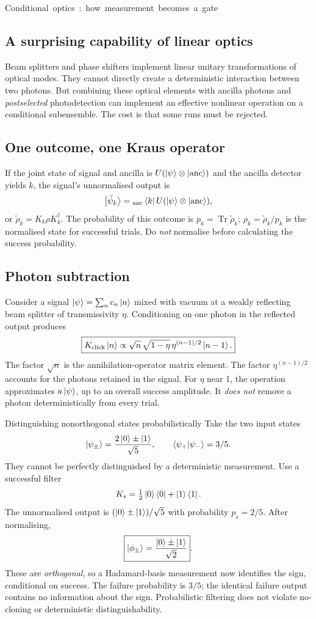\unit{Conditional optics: how measurement becomes a gate}
\subsection{A surprising capability of linear optics}
Beam splitters and phase shifters implement
linear unitary transformations of optical
modes. They cannot directly create a
deterministic interaction between two
photons. But combining these optical
elements with ancilla photons and
\emph{postselected} photodetection can
implement an effective nonlinear operation
on a conditional subensemble.
The cost is that some runs must be rejected.

\subsection{One outcome, one Kraus operator}
If the joint state of signal and ancilla
is \(U(\left\lvert \psi\right\rangle\otimes\left\lvert \rm anc\right\rangle)\)
and the ancilla detector yields \(k\),
the signal's unnormalised output is
\[
\left\lvert \tilde\psi_k\right\rangle
={}_{\rm anc}\left\langle k\right\rvert U
(\left\lvert \psi\right\rangle\otimes\left\lvert \rm anc\right\rangle),
\]
or \(\tilde\rho_k=K_k\rho K_k^\dagger\).
The probability of this outcome is
\(p_k=\operatorname{Tr}\tilde\rho_k\);
\(\rho_k=\tilde\rho_k/p_k\) is the
normalised state for successful trials.
Do \emph{not} normalise before calculating
the success probability.

\subsection{Photon subtraction}
Consider a signal
\(\left\lvert \psi\right\rangle=\sum_n c_n\left\lvert n\right\rangle\)
mixed with vacuum at a weakly reflecting
beam splitter of transmissivity \(\eta\).
Conditioning on one photon in the
reflected output produces
\[
\boxed{K_{\rm click}\left\lvert n\right\rangle\propto
\sqrt n\,\sqrt{1-\eta}\,
\eta^{(n-1)/2}\left\lvert n-1\right\rangle.}
\]
The factor \(\sqrt n\) is the
annihilation-operator matrix element.
The factor \(\eta^{(n-1)/2}\) accounts for
the photons retained in the signal.
For \(\eta\) near 1, the operation
approximates \(a\left\lvert \psi\right\rangle\), up to
an overall success amplitude.
It \emph{does not} remove a photon
deterministically from every trial.

\begin{worked}{Distinguishing nonorthogonal states probabilistically}
Take the two input states
\[
\left\lvert \psi_\pm\right\rangle=\frac{2\left\lvert 0\right\rangle\pm\left\lvert 1\right\rangle}{\sqrt5},
\qquad \langle\psi_+|\psi_-\rangle=3/5.
\]
They cannot be perfectly distinguished by
a deterministic measurement. Use a
successful filter
\[
K_s=\tfrac12\left\lvert 0\right\rangle\left\langle 0\right\rvert+\left\lvert 1\right\rangle\left\langle 1\right\rvert.
\]
The unnormalised output is
\((\left\lvert 0\right\rangle\pm\left\lvert 1\right\rangle)/\sqrt5\)
with probability \(p_s=2/5\).
After normalising,
\[
\boxed{\left\lvert \phi_\pm\right\rangle=
\frac{\left\lvert 0\right\rangle\pm\left\lvert 1\right\rangle}{\sqrt2}}.
\]
These are \emph{orthogonal}, so a
Hadamard-basis measurement now identifies
the sign, conditional on success.
The failure probability is \(3/5\);
the identical failure output contains
no information about the sign. Probabilistic
filtering does not violate no-cloning
or deterministic distinguishability.
\end{worked}

